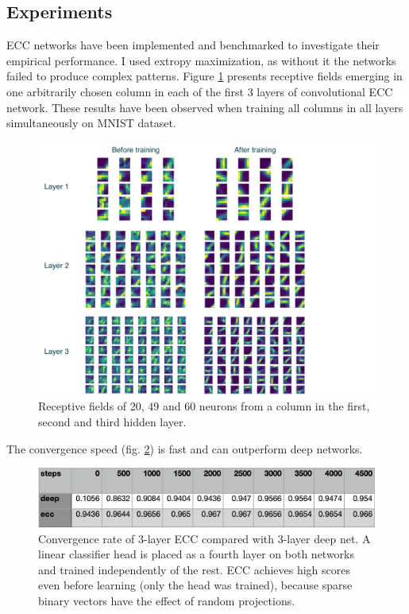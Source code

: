 \documentclass[12pt]{article}
\begin{document}
\subsection{Experiments}

ECC networks have been implemented and benchmarked to investigate their empirical performance. I used extropy maximization, as without it the networks failed to produce complex patterns.
Figure \ref{fig:receptive_fields} presents receptive fields emerging in one arbitrarily chosen column in each of the first 3 layers of convolutional ECC network. These results have been observed when training all columns in all layers simultaneously on MNIST dataset. 
\begin{figure}[!htbp]
	\centering
	\includegraphics[width=15cm]{receptive_fields}
	\caption{Receptive fields of 20, 49 and 60 neurons from a column in the first, second and third hidden layer.}
	\label{fig:receptive_fields}
\end{figure} 
The convergence speed (fig. \ref{fig:convergence_rate}) is fast and can outperform deep networks.
\begin{figure}[!htbp]
	\centering
	\includegraphics[width=13.5cm]{convergence_rate}
	\caption{Convergence rate of 3-layer ECC compared with 3-layer deep net. A linear classifier head is placed as a fourth layer on both networks and trained independently of the rest. ECC achieves high scores even before learning (only the head was trained), because sparse binary vectors have the effect of random projections.}
	\label{fig:convergence_rate}
\end{figure} 
\end{document}
